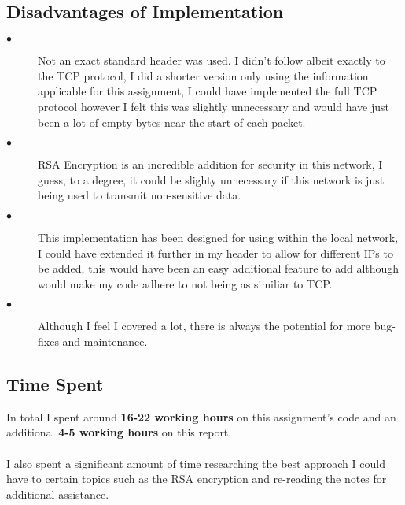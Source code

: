 \documentclass[10pt]{article}
\begin{document}
	\subsection{Disadvantages of Implementation}
		\begin{description}
		\item[$\bullet$ ] Not an exact standard header was used. I didn't follow albeit exactly to the TCP protocol, I did a shorter version only using the information applicable for this assignment, I could have implemented the full TCP protocol however I felt this was slightly unnecessary and would have just been a lot of empty bytes near the start of each packet.
		\item[$\bullet$ ] RSA Encryption is an incredible addition for security in this network, I guess, to a degree, it could be slighty unnecessary if this network is just being used to transmit non-sensitive data.
		\item[$\bullet$ ] This implementation has been designed for using within the local network, I could have extended it further in my header to allow for different IPs to be added, this would have been an easy additional feature to add although would make my code adhere to not being as similiar to TCP.
		\item[$\bullet$ ] Although I feel I covered a lot, there is always the potential for more bug-fixes and maintenance.
	\end{description}
	\subsection{Time Spent}
	In total I spent around \textbf{16-22 working hours} on this assignment's code and an additional \textbf{4-5 working hours} on this report.\\\\ I also spent a significant amount of time researching the best approach I could have to certain topics such as the RSA encryption and re-reading the notes for additional assistance.
\end{document}
